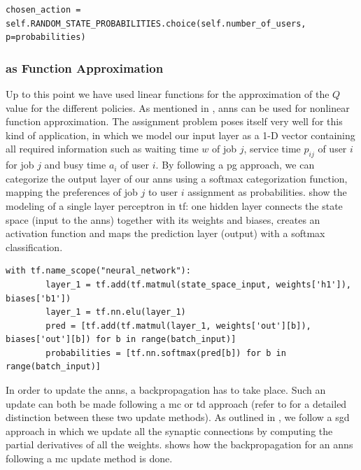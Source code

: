 \documentclass[draft=false]{seal_thesis}
\begin{document}
\begin{lstlisting}[caption=Probabilistic user choice,label=lst:prob_user_choice,style=CustomPython]
	chosen_action = self.RANDOM_STATE_PROBABILITIES.choice(self.number_of_users, p=probabilities)
\end{lstlisting}

\subsubsection{ as Function Approximation}

Up to this point we have used linear functions for the approximation of the $Q$ value for the different policies. As mentioned in , \glspl{ann} can be used for nonlinear function approximation. The assignment problem  poses itself very well for this kind of application, in which we model our input layer as a 1-D vector containing all required information such as waiting time $w$ of job $j$, service time $p_{ij}$ of user $i$ for job $j$ and busy time $a_i$ of user $i$. By following a \gls{pg} approach, we can categorize the output layer of our \glspl{ann} using a softmax categorization function, mapping the preferences of job $j$ to user $i$ assignment as probabilities.  show the modeling of a single layer perceptron in \gls{tf}: one hidden layer connects the state space (\ie input to the \glspl{ann}) together with its weights and biases, creates an activation function and maps the prediction layer (\ie output) with a softmax classification.

\begin{lstlisting}[caption=Modeling of a single perceptron in \gls{tf},label=lst:ann_1h,style=CustomPython]
	with tf.name_scope("neural_network"):
    	layer_1 = tf.add(tf.matmul(state_space_input, weights['h1']), biases['b1'])
    	layer_1 = tf.nn.elu(layer_1)
    	pred = [tf.add(tf.matmul(layer_1, weights['out'][b]), biases['out'][b]) for b in range(batch_input)]
    	probabilities = [tf.nn.softmax(pred[b]) for b in range(batch_input)]
\end{lstlisting}

In order to update the \glspl{ann}, a backpropagation has to take place. Such an update can both be made following a \gls{mc} or \gls{td} approach (refer to  for a detailed distinction between these two update methods). As outlined in , we follow a \gls{sgd} approach in which we update all the synaptic connections by computing the partial derivatives of all the weights.  shows how the backpropagation for an \glspl{ann} following a \gls{mc} update method is done.
\end{document}
